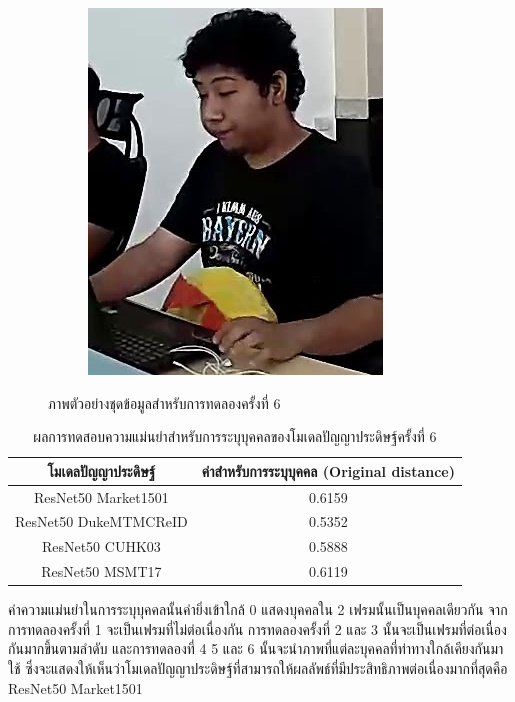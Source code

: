 \begin{figure}[!ht]
\begin{subfigure}[b]{0.2\textwidth}
        \label{fig:ex_5}
    \end{subfigure}
    \begin{subfigure}[b]{0.2\textwidth}
        \centering
        \includegraphics[width=\textwidth]{chapter4/images/o_4.jpg}
        \label{fig:ex_6}
    \end{subfigure}
    \caption{ภาพตัวอย่างชุดข้อมูลสำหรับการทดลองครั้งที่ 6}
    \label{fig: ภาพตัวอย่างชุดข้อมูลสำหรับการทดลอง 6}
\end{figure}
\begin{table}[!ht]
    \centering
    \begin{tabular}{|c|c|}
		\hline
		{โมเดลปัญญาประดิษฐ์}&{ค่าสำหรับการระบุบุคคล (Original distance)}							\\
		\hline
		ResNet50 Market1501	 			& 0.6159								\\
		ResNet50 DukeMTMCReID			& 0.5352								\\
		ResNet50 CUHK03				& 0.5888								\\
		ResNet50 MSMT17				& 0.6119								\\
	\hline
    \end{tabular}
    \caption{ผลการทดสอบความแม่นยำสำหรับการระบุบุคคลของโมเดลปัญญาประดิษฐ์ครั้งที่ 6}
    \label{tab: Original distant of image 6}
\end{table}

ค่าความแม่นยำในการระบุบุคคลนั้นค่ายิ่งเข้าใกล้ 0 แสดงบุคคลใน 2 เฟรมนั้นเป็นบุคคลเดียวกัน จากการทดลองครั้งที่ 1 จะเป็นเฟรมที่ไม่ต่อเนื่องกัน การทดลองครั้งที่ 2 และ 3 นั้นจะเป็นเฟรมที่ต่อเนื่องกันมากขึ้นตามลำดับ และการทดลองที่ 4 5 และ 6 นั้นจะนำภาพที่แต่ละบุคคลที่ท่าทางใกล้เคียงกันมาใช้ ซึ่งจะแสดงให้เห็นว่าโมเดลปัญญาประดิษฐ์ที่สามารถให้ผลลัพธ์ที่มีประสิทธิภาพต่อเนื่องมากที่สุดคือ ResNet50 Market1501
